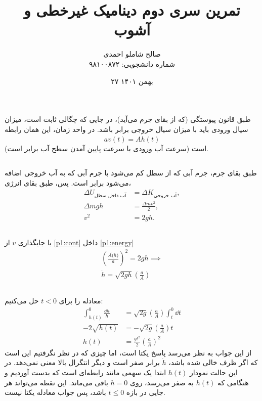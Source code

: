 \documentclass[12pt,a4paper]{article}
\title{تمرین سری دوم دینامیک غیرخطی و آشوب}
\author{صالح شاملو احمدی\\شماره دانشجویی: ۹۸۱۰۰۸۷۲}
\date{۲۷ بهمن ۱۴۰۱}
\newcommand\qfrac[2]{\left(\frac{#1}{#2}\right)}
\begin{document}
	\maketitle
	\section*{}
	\subsection*{}
	طبق قانون پیوستگی (که از بقای جرم می‌آید)، در جایی که چگالی ثابت است، میزان سیال ورودی باید با میزان سیال خروجی برابر باشد.
	در واحد زمان، این همان رابطه
	\begin{equation}
		av(t) = A\dot{h}(t) \label{p1:cont}
	\end{equation}
	است (سرعت آب ورودی با سرعت پایین آمدن سطح آب برابر است).
	\subsection*{}
	طبق بقای جرم، جرم آبی که از سطل کم می‌شود با جرم آبی که به آب خروجی اضافه می‌شود برابر است. پس، طبق بقای انرژی،
	\begin{align}
		\Delta{U}_{\text{آب داخل سطل}} &= \Delta{K}_{\text{آب خروجی}}, \\
		\Delta{m}gh &= \frac{\Delta{m} v^2}{2}, \\
		v^2 &= 2gh. \label{p1:energy}
	\end{align}
	\subsection*{}
	با جایگذاری $v$ از \eqref{p1:cont} داخل \eqref{p1:energy}
	\begin{gather}
		\qfrac{A\dot(h)}{a}^2 = 2gh \implies \\
		\dot{h} = \sqrt{2gh}\qfrac{a}{A}
	\end{gather}
	\subsection*{}
	معادله را برای $t < 0 $ حل می‌کنیم:
	\begin{align}
		\int_{h(t)}^{0}\frac{\dd{h}}{h} &= \sqrt{2g}\qfrac{a}{A}\int_{t}^{0}\dd{t} \\
		-2\sqrt{h(t)} &= -\sqrt{2g}\qfrac{a}{A}t \\
		h(t) &= \frac{gt^2}{2}\qfrac{a}{A}^2
	\end{align}
	از این جواب به نظر می‌رسد پاسخ یکتا است، اما چیزی که در نظر نگرفتیم این است که اگر ظرف خالی شده باشد، $\dot{h}$ برابر صفر است
	و دیگر انتگرال بالا معنی نمی‌دهد. در این حالت نمودار $h(t)$ ابتدا یک سهمی مانند رابطه‌ای است که بدست آوردیم و هنگامی که $h(t)$
	به صفر می‌رسد، روی $h = 0 $ باقی می‌ماند. این نقطه می‌تواند هر جایی در بازه $t\le0 $ باشد، پس جواب معادله یکتا نیست.
\end{document}
